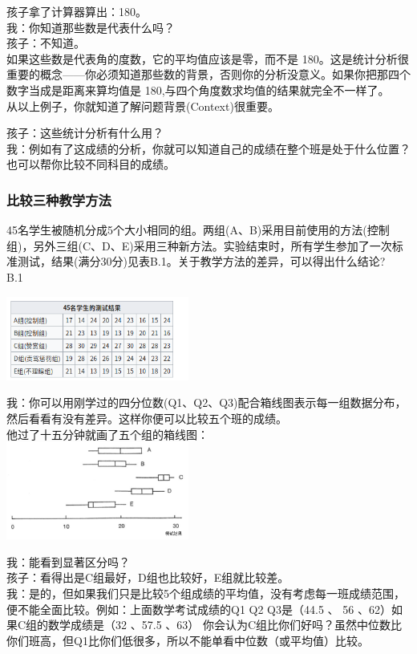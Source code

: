 孩子拿了计算器算出：180。\\
我：你知道那些数是代表什么吗？\\
孩子：不知道。\\
如果这些数是代表角的度数，它的平均值应该是零，而不是
180。这是统计分析很重要的概念------你必须知道那些数的背景，否则你的分析没意义。如果你把那四个数字当成是距离来算均值是
180,与四个角度数求均值的结果就完全不一样了。\\
从以上例子，你就知道了解问题背景(Context)很重要。

孩子：这些统计分析有什么用？\\
我：例如有了这成绩的分析，你就可以知道自己的成绩在整个班是处于什么位置？也可以帮你比较不同科目的成绩。

\hypertarget{ux6bd4ux8f83ux4e09ux79cdux6559ux5b66ux65b9ux6cd5}{%
\subsubsection{比较三种教学方法}\label{ux6bd4ux8f83ux4e09ux79cdux6559ux5b66ux65b9ux6cd5}}

45名学生被随机分成5个大小相同的组。两组(A、B)采用目前使用的方法(控制组)，另外三组(C、D、E)采用三种新方法。实验结束时，所有学生参加了一次标准测试，结果(满分30分)见表B.1。关于教学方法的差异，可以得出什么结论?\\
B.1

\includegraphics[width=6cm]{Screenshotfrom2023-11-0920-08-48.png}

我：你可以用刚学过的四分位数(Q1、Q2、Q3)配合箱线图表示每一组数据分布，然后看看有没有差异。这样你便可以比较五个班的成绩。\\
他过了十五分钟就画了五个组的箱线图：\\

\includegraphics[width=6cm]{图片61-31.jpg}

我：能看到显著区分吗？\\
孩子：看得出是C组最好，D组也比较好，E组就比较差。\\
我：是的，但如果我们只是比较5个组成绩的平均值，没有考虑每一班成绩范围，便不能全面比较。例如：上面数学考试成绩的Q1
Q2 Q3是（44.5 、 56 、62）如果C组的数学成绩是（32 、57.5 、63）
你会认为C组比你们好吗？虽然中位数比你们班高，但Q1比你们低很多，所以不能单看中位数（或平均值）比较。

